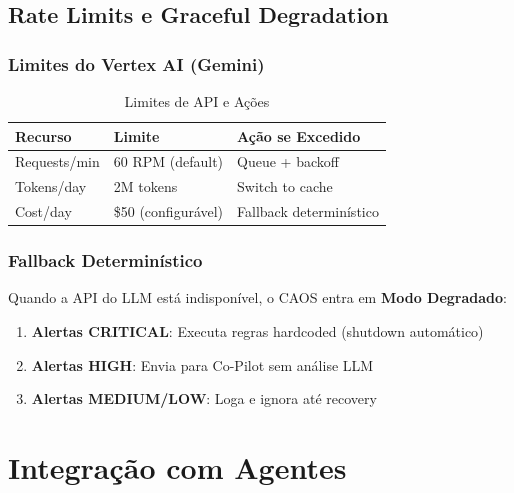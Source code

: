 \documentclass[12pt, a4paper]{article}
\begin{document}
\subsection{Rate Limits e Graceful Degradation}

\subsubsection{Limites do Vertex AI (Gemini)}

\begin{table}[h!]
\centering
\small
\begin{tabular}{|l|l|l|}
\hline
\textbf{Recurso} & \textbf{Limite} & \textbf{Ação se Excedido} \\ \hline
Requests/min & 60 RPM (default) & Queue + backoff \\ \hline
Tokens/day & 2M tokens & Switch to cache \\ \hline
Cost/day & \$50 (configurável) & Fallback determinístico \\ \hline
\end{tabular}
\caption{Limites de API e Ações}
\end{table}

\subsubsection{Fallback Determinístico}

Quando a API do LLM está indisponível, o CAOS entra em \textbf{Modo Degradado}:
\begin{enumerate}
    \item \textbf{Alertas CRITICAL}: Executa regras hardcoded (shutdown automático)
    \item \textbf{Alertas HIGH}: Envia para Co-Pilot sem análise LLM
    \item \textbf{Alertas MEDIUM/LOW}: Loga e ignora até recovery
\end{enumerate}

\newpage


\section{Integração com Agentes}
\label{sec:sinapses}
\end{document}
